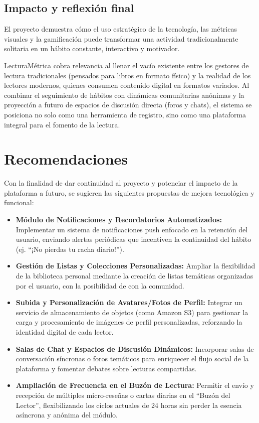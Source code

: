 \documentclass[12pt, atypical, journal]{article}
\begin{document}
\subsection{Impacto y reflexión final}

El proyecto demuestra cómo el uso estratégico de la tecnología, las métricas visuales y la gamificación puede transformar una actividad tradicionalmente solitaria en un hábito constante, interactivo y motivador.

LecturaMétrica cobra relevancia al llenar el vacío existente entre los gestores de lectura tradicionales (pensados para libros en formato físico) y la realidad de los lectores modernos, quienes consumen contenido digital en formatos variados. Al combinar el seguimiento de hábitos con dinámicas comunitarias anónimas y la proyección a futuro de espacios de discusión directa (foros y chats), el sistema se posiciona no solo como una herramienta de registro, sino como una plataforma integral para el fomento de la lectura.

\newpage

\section{Recomendaciones}
Con la finalidad de dar continuidad al proyecto y potenciar el impacto de la plataforma a futuro, se sugieren las siguientes propuestas de mejora tecnológica y funcional:

\begin{itemize}
	\item \textbf{Módulo de Notificaciones y Recordatorios Automatizados:} Implementar un sistema de notificaciones push enfocado en la retención del usuario, enviando alertas periódicas que incentiven la continuidad del hábito (ej. ``¡No pierdas tu racha diario!'').
	\item \textbf{Gestión de Listas y Colecciones Personalizadas:} Ampliar la flexibilidad de la biblioteca personal mediante la creación de listas temáticas organizadas por el usuario, con la posibilidad de con la comunidad.
	\item \textbf{Subida y Personalización de Avatares/Fotos de Perfil:} Integrar un servicio de almacenamiento de objetos (como Amazon S3) para gestionar la carga y procesamiento de imágenes de perfil personalizadas, reforzando la identidad digital de cada lector.
	\item \textbf{Salas de Chat y Espacios de Discusión Dinámicos:} Incorporar salas de conversación síncronas o foros temáticos para enriquecer el flujo social de la plataforma y fomentar debates sobre lecturas compartidas.
	\item \textbf{Ampliación de Frecuencia en el Buzón de Lectura:} Permitir el envío y recepción de múltiples micro-reseñas o cartas diarias en el ``Buzón del Lector'', flexibilizando los ciclos actuales de 24 horas sin perder la esencia asíncrona y anónima del módulo.
\end{itemize}
\end{document}
